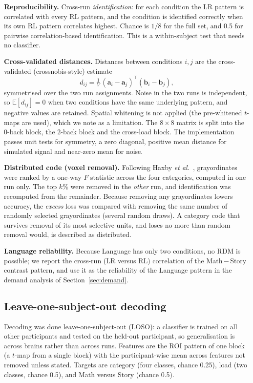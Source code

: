 \documentclass[conference]{IEEEtran}
\begin{document}
\textbf{Reproducibility.} Cross-run \emph{identification}: for each condition the LR pattern is correlated with every RL pattern, and the condition is identified correctly when its own RL pattern correlates highest. Chance is $1/8$ for the full set, and 0.5 for pairwise correlation-based identification. This is a within-subject test that needs no classifier.

\textbf{Cross-validated distances.} Distances between conditions $i,j$ are the cross-validated (crossnobis-style) estimate \cite{walther2016,nili2014}
\begin{equation}
d_{ij}=\tfrac{1}{V}\,(\mathbf{a}_i-\mathbf{a}_j)^{\!\top}(\mathbf{b}_i-\mathbf{b}_j),
\end{equation}
symmetrised over the two run assignments. Noise in the two runs is independent, so $\mathbb{E}[d_{ij}]=0$ when two conditions have the same underlying pattern, and negative values are retained. Spatial whitening is not applied (the pre-whitened $t$-maps are used), which we note as a limitation. The $8\times8$ matrix is split into the 0-back block, the 2-back block and the cross-load block. The implementation passes unit tests for symmetry, a zero diagonal, positive mean distance for simulated signal and near-zero mean for noise.

\textbf{Distributed code (voxel removal).} Following Haxby \emph{et al.}\ \cite{haxby2001}, grayordinates were ranked by a one-way $F$ statistic across the four categories, computed in one run only. The top $k\%$ were removed in the \emph{other} run, and identification was recomputed from the remainder. Because removing any grayordinates lowers accuracy, the \emph{excess} loss was compared with removing the same number of randomly selected grayordinates (several random draws). A category code that survives removal of its most selective units, and loses no more than random removal would, is described as distributed.

\textbf{Language reliability.} Because Language has only two conditions, no RDM is possible; we report the cross-run (LR versus RL) correlation of the Math\,$-$\,Story contrast pattern, and use it as the reliability of the Language pattern in the demand analysis of Section~\ref{sec:demand}.

\subsection{Leave-one-subject-out decoding}
\label{sec:decoding}
Decoding was done leave-one-subject-out (LOSO): a classifier is trained on all other participants and tested on the held-out participant, so generalisation is across brains rather than across runs. Features are the ROI pattern of one block (a $t$-map from a single block) with the participant-wise mean across features not removed unless stated. Targets are category (four classes, chance 0.25), load (two classes, chance 0.5), and Math versus Story (chance 0.5).
\end{document}
